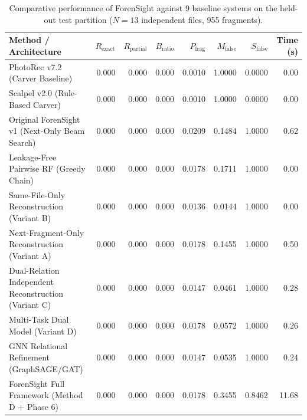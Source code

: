 \begin{table}[t]
\centering
\caption{Comparative performance of ForenSight against 9 baseline systems on the held-out test partition ($N=13$ independent files, 955 fragments).}
\label{tab:baseline_comparison}
\begin{tabular}{lrrrrrrr}
\toprule
\textbf{Method / Architecture} & \textbf{$R_{\text{exact}}$} & \textbf{$R_{\text{partial}}$} & \textbf{$B_{\text{ratio}}$} & \textbf{$P_{\text{frag}}$} & \textbf{$M_{\text{false}}$} & \textbf{$S_{\text{false}}$} & \textbf{Time (s)} \\
\midrule
PhotoRec v7.2 (Carver Baseline) & 0.000 & 0.000 & 0.000 & 0.0010 & 1.0000 & 0.0000 & 0.00 \\
Scalpel v2.0 (Rule-Based Carver) & 0.000 & 0.000 & 0.000 & 0.0010 & 1.0000 & 0.0000 & 0.00 \\
Original ForenSight v1 (Next-Only Beam Search) & 0.000 & 0.000 & 0.000 & 0.0209 & 0.1484 & 1.0000 & 0.62 \\
Leakage-Free Pairwise RF (Greedy Chain) & 0.000 & 0.000 & 0.000 & 0.0178 & 0.1711 & 1.0000 & 0.00 \\
Same-File-Only Reconstruction (Variant B) & 0.000 & 0.000 & 0.000 & 0.0136 & 0.0144 & 1.0000 & 0.00 \\
Next-Fragment-Only Reconstruction (Variant A) & 0.000 & 0.000 & 0.000 & 0.0178 & 0.1455 & 1.0000 & 0.50 \\
Dual-Relation Independent Reconstruction (Variant C) & 0.000 & 0.000 & 0.000 & 0.0147 & 0.0461 & 1.0000 & 0.28 \\
Multi-Task Dual Model (Variant D) & 0.000 & 0.000 & 0.000 & 0.0178 & 0.0572 & 1.0000 & 0.26 \\
GNN Relational Refinement (GraphSAGE/GAT) & 0.000 & 0.000 & 0.000 & 0.0147 & 0.0535 & 1.0000 & 0.24 \\
ForenSight Full Framework (Method D + Phase 6) & 0.000 & 0.000 & 0.000 & 0.0178 & 0.3455 & 0.8462 & 11.68 \\
\bottomrule
\end{tabular}
\end{table}
